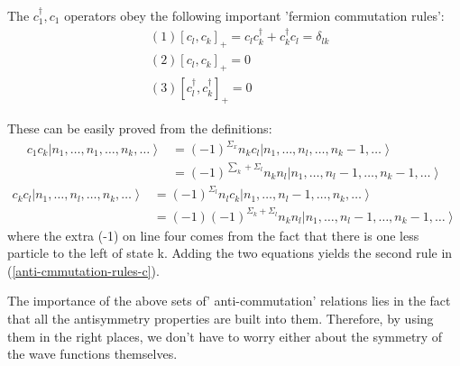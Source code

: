 \begin{imp}
The $c_{1}^{\dagger}, c_{1}$ operators obey the following important 'fermion commutation rules':
\begin{equation}
\begin{aligned}
&(1)\left[c_{l}, c_{k}\right]_{+}=c_{l} c_{k}^{\dagger}+c_{k}^{\dagger} c_{l}=\delta_{l k}\\
&(2)\left[c_{l}, c_{k}\right]_{+}=0\\
&(3)\left[c_{l}^{\dagger}, c_{k}^{\dagger}\right]_{+}=0
\end{aligned}
\label{anti-cmmutation-rules-c}
\end{equation}
\end{imp}
These can be easily proved from the definitions:
$$\begin{aligned}
c_{1} c_{k}\left|n_{1}, \ldots, n_{1}, \ldots, n_{k}, \ldots\right\rangle &=(-1)^{\Sigma_{x}} n_{k} c_{l}\left|n_{1}, \ldots, n_{l}, \ldots, n_{k}-1, \ldots\right\rangle \\
&=(-1)^{\sum_{k}+\Sigma_{l}} n_{k} n_{l}\left|n_{1}, \ldots, n_{l}-1, \ldots, n_{k}-1, \ldots\right\rangle
\end{aligned}$$
$$\begin{aligned}
c_{k} c_{l}\left|n_{1}, \ldots, n_{l}, \ldots, n_{k}, \ldots\right\rangle &=(-1)^{\Sigma_{l}} n_{l} c_{k}\left|n_{1}, \ldots, n_{l}-1, \ldots, n_{k}, \ldots\right\rangle \\
&=(-1)(-1)^{\Sigma_{k}+\Sigma_{l}} n_{k} n_{l}\left|n_{1}, \ldots, n_{l}-1, \ldots, n_{k}-1, \ldots\right\rangle
\end{aligned}$$
where the extra (-1) on line four comes from the fact that there is one less particle to the left of state k. Adding the two equations yields the second rule in (\ref{anti-cmmutation-rules-c}).

The importance of the above sets of' anti-commutation' relations lies in the fact that all the antisymmetry properties are built into them. Therefore, by using them in the right places, we don't have to worry either about the symmetry of the wave functions themselves.

